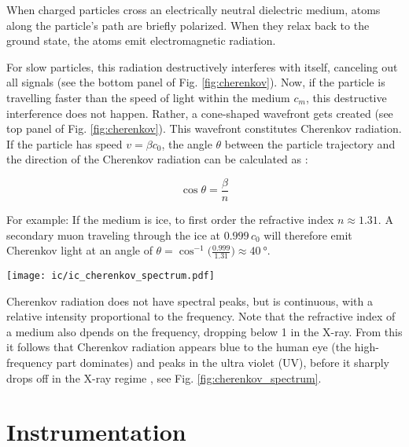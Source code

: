 When charged particles cross an electrically neutral dielectric medium, atoms along the particle's path are briefly polarized. When they relax back to the ground state, the atoms emit electromagnetic radiation.

For slow particles, this radiation destructively interferes with itself, canceling out all signals (see the bottom panel of Fig. \ref{fig:cherenkov}). Now, if the particle is travelling faster than the speed of light within the medium $c_m$, this destructive interference does not happen. Rather, a cone-shaped wavefront gets created (see top panel of Fig. \ref{fig:cherenkov}). This wavefront constitutes Cherenkov radiation. If the particle has speed $v=\beta c_0$, the angle $\theta$ between the particle trajectory and the direction of the Cherenkov radiation can be calculated as :

\begin{equation}
\cos{\theta} = \frac{\beta}{n}
\end{equation}

For example: If the medium is ice, to first order the refractive index $n\approx1.31$. A secondary muon traveling through the ice at $0.999\,c_0$ will therefore emit Cherenkov light at an angle of $\theta = \cos^{-1}{\big(\frac{0.999}{1.31}\big)} \approx \SI{40}{\degree}$. 
\begin{marginfigure}
    \texttt{[image: ic/ic\_cherenkov\_spectrum.pdf]}
    \caption[Cherenkov spectrum]{Cherenkov spectrum for a particle with $v=0.8 \,c_0$ in water. The intensity peaks at $\SI{4e15}{\Hz}$, corresponding to a wavelength of \SI{75}{\nm}, lying at the high-frequency end of the UV spectrum. Adapted from \cite{Fulop1992}.}
\end{marginfigure}
Cherenkov radiation does not have spectral peaks, but is continuous, with a relative intensity proportional to the frequency. Note that the refractive index of a medium also dpends on the frequency, dropping below 1 in the X-ray. From this it follows that Cherenkov radiation appears blue to the human eye (the high-frequency part dominates) and peaks in the ultra violet (UV), before it sharply drops off in the X-ray regime , see Fig. \ref{fig:cherenkov_spectrum}.

\section{Instrumentation}

